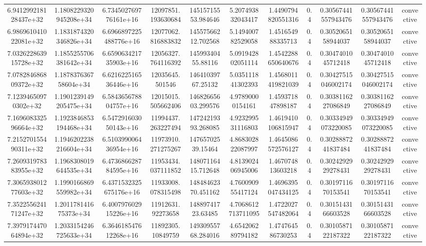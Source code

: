 \begin{table}
\begin{tabular}{ccccccccccc}
6.941299218128437e+32 & 1.1808229320945208e+34 & 6.734502769776161e+16 & 12097851.193630684 & 14515715553.984646 & 5.207493832043417 & 1.4490794820551316 & 0.4 & 0.30567441557943476 & 0.30567441557943476 & convective \\
6.986961041022081e+32 & 1.1831874320346826e+34 & 6.6966897225488776e+16 & 12077062.816883832 & 14557566212.702568 & 5.149400782529058 & 1.451654988335713 & 0.4 & 0.3052065158944037 & 0.3052065158944037 & convective \\
7.032622863915728e+32 & 1.1855255706381642e+34 & 6.659063421735903e+16 & 12056327.764116392 & 14599340455.88116 & 5.091942802051114 & 1.4542288650640676 & 0.4 & 0.3047401045712418 & 0.3047401045712418 & convective \\
7.078284686809372e+32 & 1.187837636758604e+34 & 6.621622516536446e+16 & 12035645.501546 & 14641039767.25132 & 5.035111841302393 & 1.4568011419821039 & 0.4 & 0.30427515046002174 & 0.30427515046002174 & convective \\
7.12394650970302e+32 & 1.1901239149205475e+34 & 6.584365678804757e+16 & 12015015.505662406 & 14682665603.299576 & 4.97890000154161 & 1.459371847898187 & 0.4 & 0.3038116227086849 & 0.3038116227086849 & convective \\
7.169608332596664e+32 & 1.1923846853194468e+34 & 6.547291603050143e+16 & 11994437.263227494 & 14724219393.268085 & 4.923299531116803 & 1.4619410106815947 & 0.4 & 0.30334949073220085 & 0.30334949073220085 & convective \\
7.215270155490311e+32 & 1.1946202238216604e+34 & 6.510399006436954e+16 & 11973910.271275267 & 14765702539.15464 & 4.868302822087997 & 1.4645086572576127 & 0.4 & 0.3028887241837484 & 0.3028887241837484 & convective \\
7.260931978383955e+32 & 1.1968308019644535e+34 & 6.473686628784595e+16 & 11953434.037111852 & 14807116415.712648 & 4.813902406945006 & 1.467074813603218 & 0.4 & 0.3024292929278431 & 0.3024292929278431 & convective \\
7.306593801277603e+32 & 1.1990166869559982e+34 & 6.4371532325675176e+16 & 11933008.078315498 & 14848462370.451162 & 4.760090955417124 & 1.4696395047434125 & 0.4 & 0.3019711670153541 & 0.3019711670153541 & convective \\
7.352255624171247e+32 & 1.201178141675373e+34 & 6.400797602915226e+16 & 11912631.92273658 & 14889741723.63485 & 4.7068612713711095 & 1.4722027547482064 & 0.4 & 0.3015143166603528 & 0.3015143166603528 & convective \\
7.397917447064894e+32 & 1.2033154246725633e+34 & 6.364618547612268e+16 & 11892305.10849759 & 14930955768.284016 & 4.654206289794182 & 1.474764586730253 & 0.4 & 0.3010587122187322 & 0.3010587122187322 & convective \\

\end{tabular}
\end{table}
